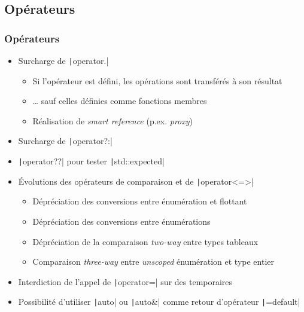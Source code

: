 \documentclass[C++.tex]{subfiles}
\begin{document}
\subsection*{Opérateurs}
\begin{frame}[fragile]
	\frametitle{Opérateurs}
	\begin{itemize}
		\item Surcharge de \texttt|operator.|
		\begin{itemize}
			\item Si l'opérateur est défini, les opérations sont transférés à son résultat
			\item \ldots{} sauf celles définies comme fonctions membres
			\item Réalisation de \textit{smart reference} (p.ex. \textit{proxy})
		\end{itemize}
		\item Surcharge de \texttt|operator?:|
		\item \texttt|operator??| pour tester \texttt|std::expected|
		\item Évolutions des opérateurs de comparaison et de \texttt|operator<=>|
		\begin{itemize}
			\item Dépréciation des conversions entre énumération et flottant
			\item Dépréciation des conversions entre énumérations
			\item Dépréciation de la comparaison \og \textit{two-way}\fg{} entre types tableaux
			\item Comparaison \textit{three-way} entre \textit{unscoped} énumération et type entier


		\end{itemize}
		\item Interdiction de l'appel de \texttt|operator=| sur des temporaires


		\item Possibilité d'utiliser \texttt|auto| ou \texttt|auto&| comme retour d'opérateur \texttt|=default|
	\end{itemize}
\end{frame}
\end{document}
